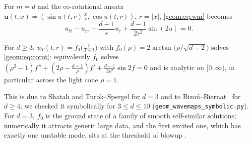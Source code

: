 For $m=d$ and the co-rotational ansatz
$\bm u(t,x)=(\sin u(t,r)\,\tfrac{x}{r},\cos u(t,r))$, $r=|x|$,
\eqref{geom:eq:wm} becomes
\begin{equation}\label{geom:eq:corot}
  u_{tt}-u_{rr}-\frac{d-1}{r}u_r+\frac{d-1}{2r^2}\sin(2u)=0 .
\end{equation}
\begin{proposition}\label{geom:prop:profile}
For $d\ge3$, $u_T(t,r)=f_0\!\bigl(\frac{r}{T-t}\bigr)$ with
$f_0(\rho)=2\arctan\bigl(\rho/\sqrt{d-2}\bigr)$ solves \eqref{geom:eq:corot};
equivalently $f_0$ solves
$(\rho^2-1)f''+(2\rho-\tfrac{d-1}{\rho})f'+\tfrac{d-1}{2\rho^2}\sin 2f=0$
and is analytic on $[0,\infty)$, in particular across the light cone $\rho=1$.
\end{proposition}
This is due to Shatah and Turok--Spergel for $d=3$ and to
Bizo\'n--Biernat~\cite{BizonBiernat2015} for $d\ge4$; we checked it
symbolically for $3\le d\le 10$ (\texttt{geom\_wavemaps\_symbolic.py}).
For $d=3$, $f_0$ is the ground state of a family of smooth self-similar
solutions; numerically it attracts generic large data, and the first excited
one, which has exactly one unstable mode, sits at the threshold of blowup
\cite{BizonChmajTabor2000}.

